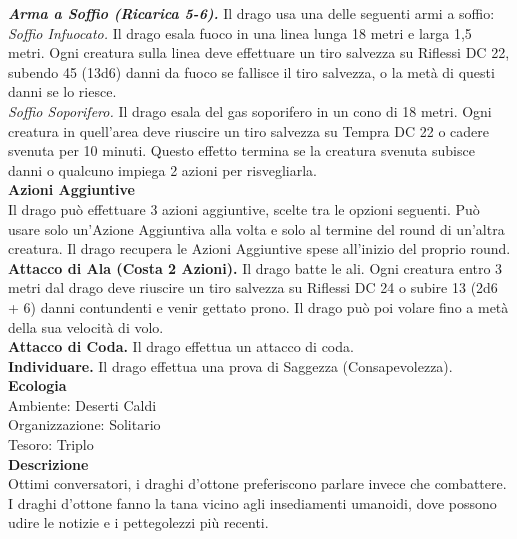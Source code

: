 \begin{multicols}{2}
\emph{\textbf{Arma a Soffio (Ricarica 5-6).}} Il drago usa una delle seguenti armi a soffio:\\
\emph{Soffio Infuocato.} Il drago esala fuoco in una linea lunga 18 metri e larga 1,5 metri. Ogni creatura sulla linea deve effettuare un tiro salvezza su Riflessi DC  22, subendo 45 (13d6) danni da fuoco se fallisce il tiro salvezza, o la metà di questi danni se lo riesce.\\
\emph{Soffio Soporifero.} Il drago esala del gas soporifero in un cono di 18 metri. Ogni creatura in quell'area deve riuscire un tiro salvezza su Tempra DC  22 o cadere svenuta per 10 minuti. Questo effetto termina se la creatura svenuta subisce danni o qualcuno impiega 2 azioni per risvegliarla.\\
\textbf{Azioni Aggiuntive}\\
Il drago può effettuare 3 azioni aggiuntive, scelte tra le opzioni seguenti. Può usare solo un'Azione Aggiuntiva alla volta e solo al termine del round di un'altra creatura. Il drago recupera le Azioni Aggiuntive spese all'inizio del proprio round.\\
\textbf{Attacco di Ala (Costa 2 Azioni).} Il drago batte le ali. Ogni creatura entro 3 metri dal drago deve riuscire un tiro salvezza su Riflessi DC  24 o subire 13 (2d6 + 6) danni contundenti e venir gettato prono. Il drago può poi volare fino a metà della sua velocità di volo.\\
\textbf{Attacco di Coda.} Il drago effettua un attacco di coda.\\
\textbf{Individuare.} Il drago effettua una prova di Saggezza (Consapevolezza).\\
\textbf{Ecologia}\\
Ambiente: Deserti Caldi\\
Organizzazione: Solitario\\
Tesoro: Triplo\\
\textbf{Descrizione}\\
Ottimi conversatori, i draghi d’ottone preferiscono parlare invece che combattere. I draghi d’ottone fanno la tana vicino agli insediamenti umanoidi, dove possono udire le notizie e i pettegolezzi più recenti.\\



\end{multicols}
